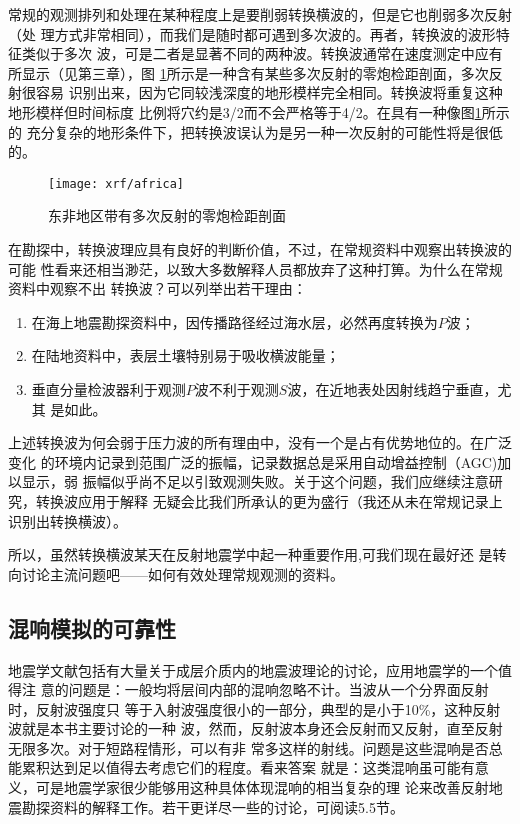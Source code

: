 常规的观测排列和处理在某种程度上是要削弱转换横波的，但是它也削弱多次反射（处
理方式非常相同），而我们是随时都可遇到多次波的。再者，转换波的波形特征类似于多次
波，可是二者是显著不同的两种波。转换波通常在速度测定中应有所显示（见第三章），图
\ref{fig:xrf/africa}所示是一种含有某些多次反射的零炮检距剖面，多次反射很容易
识别出来，因为它同较浅深度的地形模样完全相同。转换波将重复这种地形模样但时间标度
比例将穴约是3/2而不会严格等于4/2。在具有一种像图\ref{fig:xrf/africa}所示的
充分复杂的地形条件下，把转换波误认为是另一种一次反射的可能性将是很低的。
\begin{figure}[H]
\centering
\texttt{[image: xrf/africa]}
\caption[africa]{东非地区带有多次反射的零炮检距剖面}
\label{fig:xrf/africa}
\end{figure}
在勘探中，转换波理应具有良好的判断价值，不过，在常规资料中观察出转换波的可能
性看来还相当渺茫，以致大多数解释人员都放弃了这种打箅。为什么在常规资料中观察不出
转换波？可以列举出若干理由：
\begin{enumerate}
\item
  在海上地震勘探资料中，因传播路径经过海水层，必然再度转换为$P$波；
\item
  在陆地资料中，表层土壤特别易于吸收横波能量；
\item 垂直分量检波器利于观测$P$波不利于观测$S$波，在近地表处因射线趋宁垂直，尤其
是如此。
\end{enumerate}

上述转换波为何会弱于压力波的所有理由中，没有一个是占有优势地位的。在广泛变化
的环境内记录到范围广泛的振幅，记录数据总是采用自动增益控制（AGC)加以显示，弱
振幅似乎尚不足以引致观测失败。关于这个问题，我们应继续注意研究，转换波应用于解释
无疑会比我们所承认的更为盛行（我还从未在常规记录上识别出转换横波）。

所以，虽然转换横波某天在反射地震学中起一种重要作用,可我们现在最好还
是转向讨论主流问题吧——如何有效处理常规观测的资料。

\subsection{混响模拟的可靠性}
地震学文献包括有大量关于成层介质内的地震波理论的讨论，应用地震学的一个值得注
意的问题是：一般均将层间内部的混响忽略不计。当波从一个分界面反射时，反射波强度只
等于入射波强度很小的一部分，典型的是小于10\%，这种反射波就是本书主要讨论的一种
波，然而，反射波本身还会反射而又反射，直至反射无限多次。对于短路程情形，可以有非
常多这样的射线。问题是这些混响是否总能累积达到足以值得去考虑它们的程度。看来答案
就是：这类混响虽可能有意义，可是地震学家很少能够用这种具体体现混响的相当复杂的理
论来改善反射地震勘探资料的解释工作。若干更详尽一些的讨论，可阅读5.5节。


